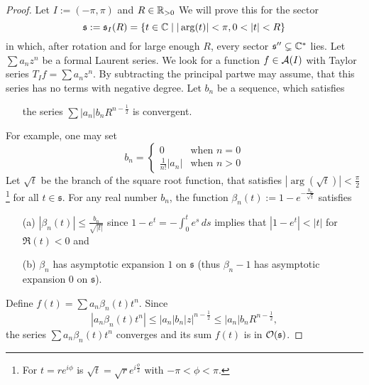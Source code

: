 \begin{proof}
  \begin{comment}
    \begin{itemize}
      \item \cite[Lem.II.2.2.5]{sabbah_cimpa90}: $T_I$
      \item \textbf{\cite[Th.7.3]{van2003galois}}: $T_I=T_{(a,b)}$
      \item \cite[Th.2.4.1]{Loday2014}: $T_{\mathfrak{s}}$
    \end{itemize}
  \end{comment}
  Let $I:=(-\pi,\pi)$ and $R\in\mathbb{R}_{>0}$
  We will prove this for the sector
  \[
    \mathfrak{s}:=\mathfrak{s}_{I}(R)=\left\{
      t\in\C\mid |\arg(t)|<\pi, 0<|t|<R
    \right\}
  \]
  in which, after rotation and for large enough $R$, every sector
  $\mathfrak{s}''\subsetneq\mathbb{C}^*$ lies.
  Let $\sum a_nz^n$ be a formal Laurent series. We look for a function
  $f\in\mathcal{A}(I)$ with Taylor series $T_{I}f=\sum a_nz^n$.
  By subtracting the principal part\TODO[?] we may assume, that this series has
  no terms with negative degree.
  Let $b_n$ be a sequence, which satisfies
  \begin{itemize}
    \item[] the series $\sum |a_n|b_nR^{n-\frac{1}{2}}$ is convergent.
  \end{itemize}
  For example, one may set
  \[
    b_n=\begin{cases}
      0                 & \text{when~} n=0
      \\\frac{1}{n!}|a_n| & \text{when~} n>0
    \end{cases}
  \]
  Let $\sqrt{t}$ be the branch of the square root function, that satisfies
  $|\arg(\sqrt{t})|<\frac{\pi}{2}$\footnote{For $t=re^{i\phi}$ is
  $\sqrt{t}=\sqrt{r}e^{i\frac{\phi}{2}}$ with $-\pi<\phi<\pi$.} for all
  $t\in\mathfrak{s}$.
  For any real number $b_n$, the function
  $\beta_n(t):=1-e^{-\frac{b_n}{\sqrt{t}}}$ satisfies
  \begin{enumerate}
    \item[(a)] $|\beta_n(t)|\leq\frac{b_n}{\sqrt{|t|}}$ since
      $1-e^t=-\int_0^te^s\,ds$ implies that $|1-e^t|<|t|$ for $\Re(t)<0$ and
    \item[(b)] $\beta_n$ has asymptotic expansion $1$ on $\mathfrak{s}$ (thus
      $\beta_n-1$ has asymptotic expansion $0$ on $\mathfrak{s}$).
  \end{enumerate}
  Define $f(t)=\sum a_n\beta_n(t)t^n$.
  Since 
  \[
    |a_n\beta_n(t)t^n|
    \leq|a_n|b_n|z|^{n-\frac{1}{2}}
    \leq|a_n|b_nR^{n-\frac{1}{2}},
  \]
  the series
  $\sum a_n\beta_n(t)t^n$ converges and its sum $f(t)$ is in
  $\mathcal{O}(\mathfrak{s})$.


\end{proof}
